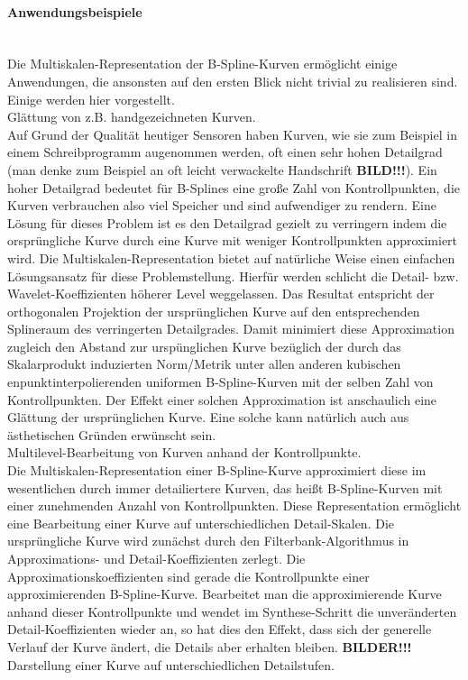 \documentclass{article}
\begin{document}
\paragraph{Anwendungsbeispiele}~\\
Die Multiskalen-Representation der B-Spline-Kurven ermöglicht einige Anwendungen, die ansonsten auf den ersten Blick nicht trivial zu realisieren sind. Einige werden hier vorgestellt.
\\
Glättung von z.B. handgezeichneten Kurven.\\
Auf Grund der Qualität heutiger Sensoren haben Kurven, wie sie zum Beispiel in einem Schreibprogramm augenommen werden, oft einen sehr hohen Detailgrad (man denke zum Beispiel an oft leicht verwackelte Handschrift \textbf{BILD!!!}). Ein hoher Detailgrad bedeutet für B-Splines eine große Zahl von Kontrollpunkten, die Kurven verbrauchen also viel Speicher und sind aufwendiger zu rendern. Eine Lösung für dieses Problem ist es den Detailgrad gezielt zu verringern indem die orsprüngliche Kurve durch eine Kurve mit weniger Kontrollpunkten approximiert wird. Die Multiskalen-Representation bietet auf natürliche Weise einen einfachen Lösungsansatz für diese Problemstellung. Hierfür werden schlicht die Detail- bzw. Wavelet-Koeffizienten höherer Level weggelassen. Das Resultat entspricht der orthogonalen Projektion der ursprünglichen Kurve auf den entsprechenden Splineraum des verringerten Detailgrades. Damit minimiert diese Approximation zugleich den Abstand zur urspünglichen Kurve bezüglich der durch das Skalarprodukt induzierten Norm/Metrik unter allen anderen kubischen enpunktinterpolierenden uniformen B-Spline-Kurven mit der selben Zahl von Kontrollpunkten.
Der Effekt einer solchen Approximation ist anschaulich eine Glättung der ursprünglichen Kurve. Eine solche kann natürlich auch aus ästhetischen Gründen erwünscht sein.
\\
Multilevel-Bearbeitung von Kurven anhand der Kontrollpunkte.\\
Die Multiskalen-Representation einer B-Spline-Kurve approximiert diese im wesentlichen durch immer detailiertere Kurven, das heißt B-Spline-Kurven mit einer zunehmenden Anzahl von Kontrollpunkten. Diese Representation ermöglicht eine Bearbeitung einer Kurve auf unterschiedlichen Detail-Skalen. Die ursprüngliche Kurve wird zunächst durch den Filterbank-Algorithmus in Approximations- und Detail-Koeffizienten zerlegt. Die Approximationskoeffizienten sind gerade die Kontrollpunkte einer approximierenden B-Spline-Kurve. Bearbeitet man die approximierende Kurve anhand dieser Kontrollpunkte und wendet im Synthese-Schritt die unveränderten Detail-Koeffizienten wieder an, so hat dies den Effekt, dass sich der generelle Verlauf der Kurve ändert, die Details aber erhalten bleiben. \textbf{BILDER!!!}
\\
Darstellung einer Kurve auf unterschiedlichen Detailstufen.
%
%
%
\end{document}
